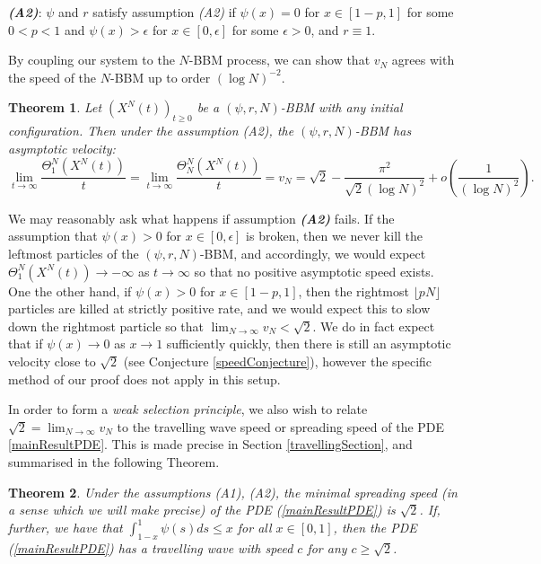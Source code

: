 \documentclass{article}
\newtheorem{theorem}{Theorem}
\begin{document}
\textbf{\textit{(A2)}}: $\psi$ and $r$ satisfy assumption \textit{(A2)} if $\psi(x)=0$ for $x\in [1-p,1]$ for some $0<p<1$ and $\psi(x)>\epsilon$ for $x\in [0,\epsilon]$ for some $\epsilon>0$, and $r\equiv 1$.

By coupling our system to the $N$-BBM process, we can show that $v_N$ agrees with the speed of the $N$-BBM  up to order $(\log N)^{-2}$.

\vspace{1em}

\begin{theorem} \label{asympSpeedTheorem}
    Let $(X^N(t))_{t\geq 0}$ be a $(\psi,r,N)$-BBM with any initial configuration. Then under the assumption \textit{(A2)}, the $(\psi,r,N)$-BBM has asymptotic velocity:
    $$\lim_{t\to\infty}\frac{\Theta^N_1(X^N(t))}{t}=\lim_{t\to\infty}\frac{\Theta^N_N(X^N(t))}{t} = v_N = \sqrt{2}-\frac{\pi^2}{\sqrt{2}(\log N)^2} + o\left(\frac{1}{(\log N)^2}\right).$$ 
\end{theorem}

We may reasonably ask what happens if assumption \textit{\textbf{(A2)}} fails. If the assumption that $\psi(x)>0$ for $x\in [0,\epsilon]$ is broken, then we never kill the leftmost particles of the $(\psi,r,N)$-BBM, and accordingly, we would expect $\Theta_1^N(X^N(t))\to -\infty$ as $t\to\infty$ so that no positive asymptotic speed exists. One the other hand, if $\psi(x)>0$ for $x\in [1-p,1]$, then the rightmost $\lfloor pN\rfloor$ particles are killed at strictly positive rate, and we would expect this to slow down the rightmost particle so that $\lim_{N\to\infty}v_N<\sqrt{2}$. We do in fact expect that if $\psi(x)\to 0$ as $x\to 1$ sufficiently quickly, then there is still an asymptotic velocity close to $\sqrt{2}$ (see Conjecture \ref{speedConjecture}), however the specific method of our proof does not apply in this setup. 

In order to form a \textit{weak selection principle}, we also wish to relate $\sqrt{2}=\lim_{N\to\infty}v_N$ to the travelling wave speed or spreading speed of the PDE \eqref{mainResultPDE}. This is made precise in Section \ref{travellingSection}, and summarised in the following Theorem.

\vspace{1em}

\begin{theorem} \label{partialWeakSelecTheorem}
    Under the assumptions \textit{(A1), (A2)}, the minimal spreading speed (in a sense which we will make precise) of the PDE (\ref{mainResultPDE}) is $\sqrt{2}$. If, further, we have that $\int_{1-x}^1 \psi(s)ds \leq x$ for all $x\in [0,1]$, then the PDE (\ref{mainResultPDE}) has a travelling wave with speed $c$ for any $c\geq \sqrt{2}$. 
\end{theorem}
\end{document}
